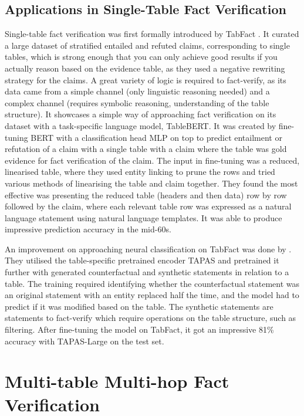 \subsection{Applications in Single-Table Fact Verification} 
Single-table fact verification was first formally introduced by TabFact \parencite{chen2019tabfact}. It curated a large dataset of stratified entailed and refuted claims, corresponding to single tables, which is strong enough that you can only achieve good results if you actually reason based on the evidence table, as they used a negative rewriting strategy for the claims. A great variety of logic is required to fact-verify, as its data came from a simple channel (only linguistic reasoning needed) and a complex channel (requires symbolic reasoning, understanding of the table structure). It showcases a simple way of approaching fact verification on its dataset with a task-specific language model, TableBERT. It was created by fine-tuning BERT \parencite{devlin2019bert} with a classification head MLP on top to predict entailment or refutation of a claim with a single table with a claim where the table was gold evidence for fact verification of the claim. The input in fine-tuning was a reduced, linearised table, where they used entity linking to prune the rows and tried various methods of linearising the table and claim together. They found the most effective was presenting the reduced table (headers and then data) row by row followed by the claim, where each relevant table row was expressed as a natural language statement using natural language templates. It was able to produce impressive prediction accuracy in the mid-60s. 

\vspace{\baselineskip}
\noindent An improvement on approaching neural classification on TabFact was done by \textcite{eisenschlos2020understanding}. They utilised the table-specific pretrained encoder TAPAS \parencite{herzig2020tapas} and pretrained it further with generated counterfactual and synthetic statements in relation to a table. The training required identifying whether the counterfactual statement was an original statement with an entity replaced half the time, and the model had to predict if it was modified based on the table. The synthetic statements are statements to fact-verify which require operations on the table structure, such as filtering. After fine-tuning the model on TabFact, it got an impressive 81\% accuracy with TAPAS-Large on the test set. 

\section{Multi-table Multi-hop Fact Verification}

